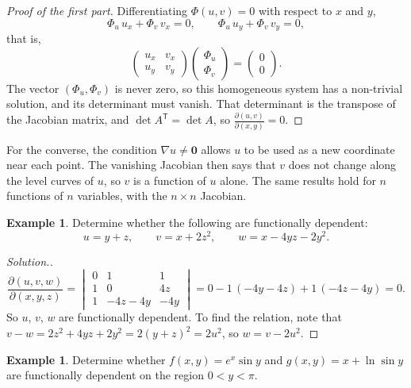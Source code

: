 \documentclass[11pt,a4paper]{article}
\theoremstyle{definition}
\newtheorem{exa}[thm]{Example}
\newenvironment{solution}
  {\renewcommand{\qedsymbol}{}\begin{proof}[\textit{Solution}.]}
  {\end{proof}}
\begin{document}
\begin{proof}[Proof of the first part]
Differentiating $\Phi(u,v) = 0$ with respect to $x$ and $y$,
\[\Phi_u\,u_x + \Phi_v\,v_x = 0,\qquad \Phi_u\,u_y + \Phi_v\,v_y = 0,\]
that is,
\[\begin{pmatrix}
u_x & v_x\\
u_y & v_y
\end{pmatrix}
\begin{pmatrix}
\Phi_u\\
\Phi_v
\end{pmatrix}
= \begin{pmatrix} 0\\ 0\end{pmatrix}.\]
The vector $(\Phi_u,\Phi_v)$ is never zero, so this homogeneous system has a
non-trivial solution, and its determinant must vanish. That determinant is the
transpose of the Jacobian matrix, and $\det A^{\mathsf T} = \det A$, so
$\frac{\partial(u,v)}{\partial(x,y)} = 0$.
\end{proof}

For the converse, the condition $\nabla u\neq\mathbf 0$ allows $u$ to be used as
a new coordinate near each point. The vanishing Jacobian then says that $v$ does
not change along the level curves of $u$, so $v$ is a function of $u$ alone. The
same results hold for $n$ functions of $n$ variables, with the $n\times n$
Jacobian.

\begin{exa}
\label{ex:dependent3}
Determine whether the following are functionally dependent:
\[u = y + z,\qquad v = x + 2z^2,\qquad w = x - 4yz - 2y^2 .\]
\end{exa}

\begin{solution}
\[\frac{\partial (u,v,w)}{\partial (x,y,z)} = \begin{vmatrix}
0 & 1 & 1\\
1 & 0 & 4z\\
1 & -4z - 4y & -4y
\end{vmatrix} = 0 - 1\,(-4y - 4z) + 1\,(-4z - 4y) = 0 .\]
So $u$, $v$, $w$ are functionally dependent. To find the relation, note that
$v - w = 2z^2 + 4yz + 2y^2 = 2(y + z)^2 = 2u^2$, so $w = v - 2u^2$.
\end{solution}

\begin{exa}
\label{ex:dependentlog}
Determine whether $f(x,y) = e^x \sin y$ and $g(x,y) = x + \ln \sin y$ are
functionally dependent on the region $0<y<\pi$.
\end{exa}
\end{document}
